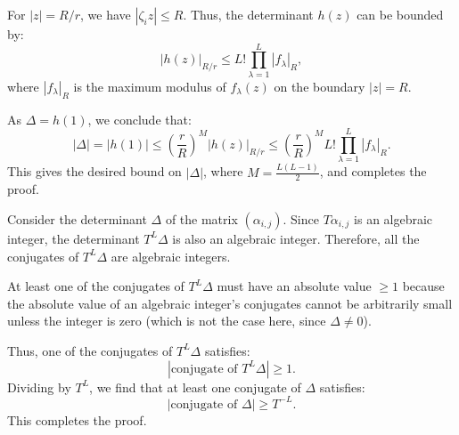 \documentclass{article}
\newenvironment{proofbox}
  {\begin{mdframed}[linewidth=1pt,linecolor=black,backgroundcolor=white]\noindent\ignorespaces}
  {\end{mdframed}}
\begin{document}
\begin{proofbox}
For \( |z| = R/r \), we have \( |\zeta_i z| \leq R \). Thus, the determinant \( h(z) \) can be bounded by:
\[
|h(z)|_{R/r} \leq L! \prod_{\lambda=1}^{L} |f_\lambda|_R,
\]
where \( |f_\lambda|_R \) is the maximum modulus of \( f_\lambda(z) \) on the boundary \( |z| = R \).


As \( \Delta = h(1) \), we conclude that:
\[
|\Delta| = |h(1)| \leq \left( \frac{r}{R} \right)^M |h(z)|_{R/r} \leq \left( \frac{r}{R} \right)^M L! \prod_{\lambda=1}^{L} |f_\lambda|_R.
\]
This gives the desired bound on \( |\Delta| \), where \( M = \frac{L(L-1)}{2} \), and completes the proof.

\end{proofbox}

\begin{proofbox}
    Consider the determinant \( \Delta \) of the matrix \( (\alpha_{i,j}) \). Since \( T \alpha_{i,j} \) is an algebraic integer, the determinant \( T^L \Delta \) is also an algebraic integer. Therefore, all the conjugates of \( T^L \Delta \) are algebraic integers.

At least one of the conjugates of \( T^L \Delta \) must have an absolute value \( \geq 1 \) because the absolute value of an algebraic integer's conjugates cannot be arbitrarily small unless the integer is zero (which is not the case here, since \( \Delta \neq 0 \)).

Thus, one of the conjugates of \( T^L \Delta \) satisfies:
\[
| \text{conjugate of } T^L \Delta | \geq 1.
\]
Dividing by \( T^L \), we find that at least one conjugate of \( \Delta \) satisfies:
\[
| \text{conjugate of } \Delta | \geq T^{-L}.
\]
This completes the proof.
\end{proofbox}
\end{document}
